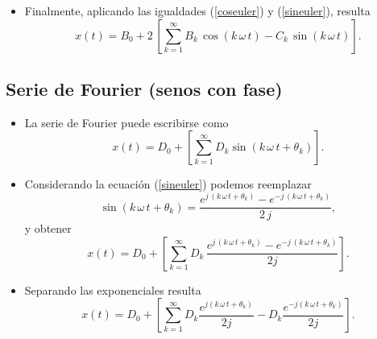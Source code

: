\begin{itemize}
\item Finalmente, aplicando las igualdades (\ref{coseuler}) y (\ref{sineuler}), resulta
\begin{equation}
x\left( t\right) =
  B_{0}+
  2 \, \left[ \sum_{k=1}^{\infty }
             B_{k} \, \cos \left( k \, \omega \, t\right) -
             C_{k} \, \sin \left( k \, \omega \, t\right) 
       \right] .
\end{equation}

\end{itemize}

\subsection{Serie de Fourier (senos con fase)}

\begin{itemize}

\item La serie de Fourier puede escribirse como
\begin{equation}
 x\left( t\right) =
D_{0}+
\left[ \sum_{k=1}^{\infty }D_{k}\sin \left( k \, \omega \, t+\theta _{k}\right) \right] .
\end{equation}

\item Considerando la ecuaci\'{o}n (\ref{sineuler}) podemos reemplazar
\begin{equation}
\sin \left( k \, \omega \, t+\theta_{k}\right) = 
\frac{e^{j \, \left( k \, \omega \, t+\theta_{k}\right)}-e^{-j \, \left( k \, \omega \, t+\theta_{k}\right)}}{2 \, j},
\end{equation}
y obtener
\begin{equation}
x\left( t\right) =
D_{0}+
\left[ \sum_{k=1}^{\infty}
    D_{k} \, 
    \frac{e^{j \, \left( k \, \omega \, t+\theta_{k}\right)}-e^{-j \, \left( k \, \omega \, t+\theta _{k}\right)}}
    {2 j}
\right] .
\end{equation}

\item Separando las exponenciales resulta
\begin{equation}
        x\left( t\right) =
                D_{0}+
                \left[ 
                        \sum_{k=1}^{\infty}
                                D_{k} \frac{e^{j \left( k \, \omega \, t+\theta _{k}\right)}}{2 j} -
                                D_{k} \frac{e^{-j \left( k \, \omega \, t+\theta _{k}\right)}}{2 j}
                \right] .
\end{equation}


\end{itemize}
